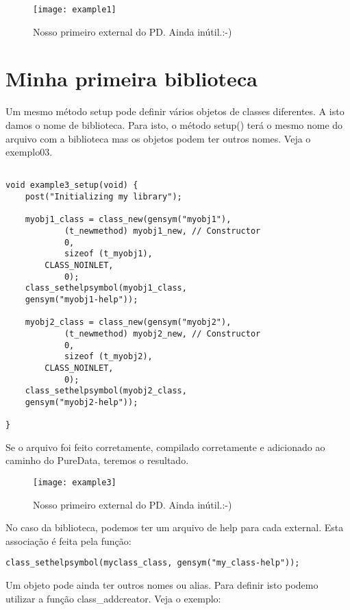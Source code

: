 \begin{figure}[h!]
	\centering
	\texttt{[image: example1]}
	\caption{Nosso primeiro external do PD. Ainda inútil.:-)}
\end{figure}

\section{Minha primeira biblioteca}

Um mesmo método setup pode definir vários objetos de classes diferentes. A
isto damos o nome de biblioteca. Para isto, o método setup() terá o mesmo nome
do arquivo com a biblioteca mas os objetos podem ter outros nomes. Veja o
exemplo03.

\begin{lstlisting}

void example3_setup(void) {
    post("Initializing my library");

    myobj1_class = class_new(gensym("myobj1"),
            (t_newmethod) myobj1_new, // Constructor
            0,
            sizeof (t_myobj1),
	    CLASS_NOINLET,
            0);
    class_sethelpsymbol(myobj1_class, 
	gensym("myobj1-help"));

    myobj2_class = class_new(gensym("myobj2"),
            (t_newmethod) myobj2_new, // Constructor
            0,
            sizeof (t_myobj2),
	    CLASS_NOINLET,
            0);
    class_sethelpsymbol(myobj2_class, 
	gensym("myobj2-help"));

}
\end{lstlisting}

Se o arquivo foi feito corretamente, compilado corretamente e adicionado ao
caminho do PureData, teremos o resultado.

\begin{figure}[h!]
	\centering
	\texttt{[image: example3]}
	\caption{Nosso primeiro external do PD. Ainda inútil.:-)}
\end{figure}


No caso da biblioteca, podemos ter um arquivo de help para cada external. Esta
associação é feita pela função:

\begin{lstlisting}
class_sethelpsymbol(myclass_class, gensym("my_class-help"));
\end{lstlisting}

Um objeto pode ainda ter outros nomes ou alias. Para definir isto podemo utilizar a função class\_addcreator. Veja o exemplo:

